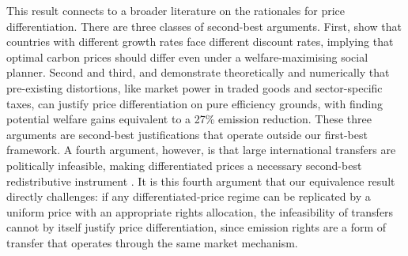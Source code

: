 \documentclass[12pt,english]{article}
\begin{document}
This result connects to a broader literature on the rationales for price differentiation. There are three classes of second-best arguments. First, \citet{anthoff2022} show that countries with different growth rates face different discount rates, implying that optimal carbon prices should differ even under a welfare-maximising social planner. Second and third, \citet{babiker2005} and \citet{boeters2014} demonstrate theoretically and numerically that pre-existing distortions, like market power in traded goods and sector-specific taxes, can justify price differentiation on pure efficiency grounds, with \citet{boeters2014} finding potential welfare gains equivalent to a 27\% emission reduction. These three arguments are second-best justifications that operate outside our first-best framework. A fourth argument, however, is that large international transfers are politically infeasible, making differentiated prices a necessary second-best redistributive instrument \citep{bauer2020, youngbrun2025}. It is this fourth argument that our equivalence result directly challenges: if any differentiated-price regime can be replicated by a uniform price with an appropriate rights allocation, the infeasibility of transfers cannot by itself justify price differentiation, since emission rights are a form of transfer that operates through the same market mechanism.



\end{document}
